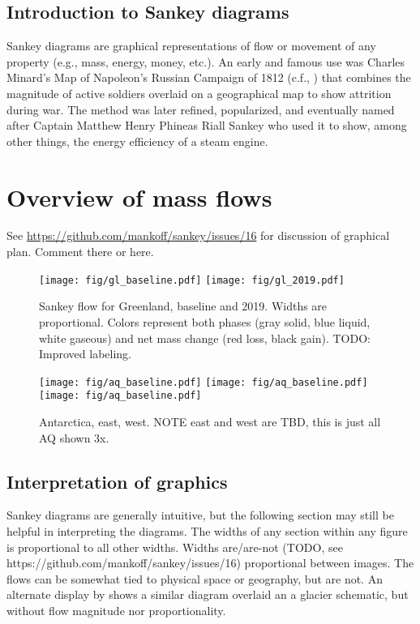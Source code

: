 \documentclass[review,jog]{igs}
\begin{document}
\subsection{Introduction to Sankey diagrams}

Sankey diagrams are graphical representations of flow or movement of any property (e.g., mass, energy, money, etc.). An early and famous use was Charles Minard's Map of Napoleon's Russian Campaign of 1812 (c.f., \citet{kraak_2021}) that combines the magnitude of active soldiers overlaid on a geographical map to show attrition during war. The method was later refined, popularized, and eventually named after Captain Matthew Henry Phineas Riall Sankey who used it to show, among other things, the energy efficiency of a steam engine.

\section{Overview of mass flows}

See \url{https://github.com/mankoff/sankey/issues/16} for discussion of graphical plan. Comment there or here. 

\begin{figure}
  \centering
  \texttt{[image: fig/gl\_baseline.pdf]}
  \texttt{[image: fig/gl\_2019.pdf]}
  \caption{Sankey flow for Greenland, baseline and 2019. Widths are proportional. Colors represent both phases (gray solid, blue liquid, white gaseous) and net mass change (red loss, black gain). TODO: Improved labeling.}
    \label{fig:gl}
\end{figure}

\begin{figure}
  \centering
  \texttt{[image: fig/aq\_baseline.pdf]}
  \texttt{[image: fig/aq\_baseline.pdf]}
  \texttt{[image: fig/aq\_baseline.pdf]}
  \caption{Antarctica, east, west. NOTE east and west are TBD, this is just all AQ shown 3x.}
  \label{fig:aq}
\end{figure}

\subsection{Interpretation of graphics}

Sankey diagrams are generally intuitive, but the following section may still be helpful in interpreting the diagrams. The widths of any section within any figure is proportional to all other widths. Widths are/are-not (TODO, see https://github.com/mankoff/sankey/issues/16) proportional between images. The flows can be somewhat tied to physical space or geography, but are not. An alternate display by \citet[Fig. 2]{cogley_2011} shows a similar diagram overlaid an a glacier schematic, but without flow magnitude nor proportionality.
\end{document}
